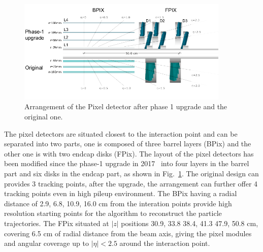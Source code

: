 \begin{figure}[H]\centering
    \includegraphics[width=0.9\textwidth]{figure/cms_pixel.png}
    \caption{Arrangement of the Pixel detector after phase 1 upgrade and the original one.}
    \label{fig:cms_pixel}
\end{figure}

The pixel detectors are situated closest to the interaction point and can be separated into two parts, one is composed of three barrel layers (BPix) and the other one is with two endcap disks (FPix).
The layout of the pixel detectors has been modified since the phase-1 upgrade in 2017~\cite{CMSTrackerGroup:2020edz} into four layers in the barrel part and six disks in the endcap part, as shown in Fig.~\ref{fig:cms_pixel}.
The original design can provides 3 tracking points, after the upgrade, the arrangement can further offer 4 tracking points even in high pileup environment.
The BPix having a radial distance of 2.9, 6.8, 10.9, 16.0 cm from the interation points provide high resolution starting points for the algorithm to reconstruct the particle trajectories.
The FPix situated at $|z|$ positions 30.9, 33.8 38.4, 41.3 47.9, 50.8 cm, covering 6.5 cm of radial distance from the beam axis, giving the pixel modules and angular coverage up to $|\eta|<2.5$ around the interaction point.

